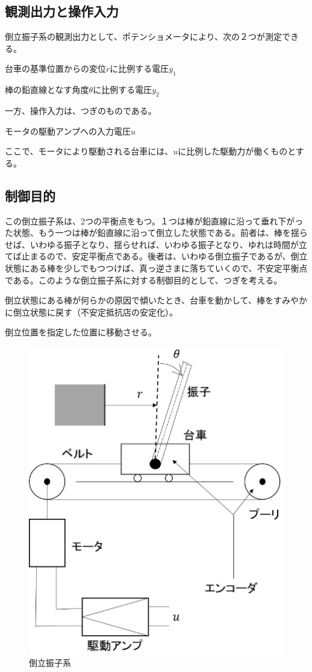 \documentclass[a4j,11pt,twoside]{ujbook}
\begin{document}
		\subsection{観測出力と操作入力}
			倒立振子系の観測出力として、ポテンショメータにより、次の２つが測定できる。
			\begin{description}
				\setlength{\itemindent}{0pt}
				\item[1°] 台車の基準位置からの変位$r$に比例する電圧$y_1$
				\item[2°] 棒の鉛直線となす角度$\theta$に比例する電圧$y_2$
			\end{description}
			一方、操作入力は、つぎのものである。
			\begin{description}
			\setlength{\itemindent}{0pt}
			\item[1°] モータの駆動アンプへの入力電圧$u$
			\end{description}
			ここで、モータにより駆動される台車には、$u$に比例した駆動力が働くものとする。

		\subsection{制御目的}
			この倒立振子系は、2つの平衡点をもつ。１つは棒が鉛直線に沿って垂れ下がった状態、もう一つは棒が鉛直線に沿って倒立した状態である。前者は、棒を揺らせば、いわゆる振子となり、揺らせれば、いわゆる振子となり、ゆれは時間が立てば止まるので、安定平衡点である。後者は、いわゆる倒立振子であるが、倒立状態にある棒を少しでもつつけば、真っ逆さまに落ちていくので、不安定平衡点である。このような倒立振子系に対する制御目的として、つぎを考える。
			\begin{description}
			\setlength{\itemindent}{0pt}
			\item[1゜]倒立状態にある棒が何らかの原因で傾いたとき、台車を動かして、棒をすみやかに倒立状態に戻す（不安定抵抗店の安定化）。
			\item[2゜]倒立位置を指定した位置に移動させる。
			\end{description}
			\begin{figure}[htbp]
				\begin{center}
					\includegraphics[width = 0.6 \linewidth]{pendulum.eps}
					\caption{倒立振子系}
					\label{fig:倒立振子系}
				\end{center}
			\end{figure}
\end{document}
